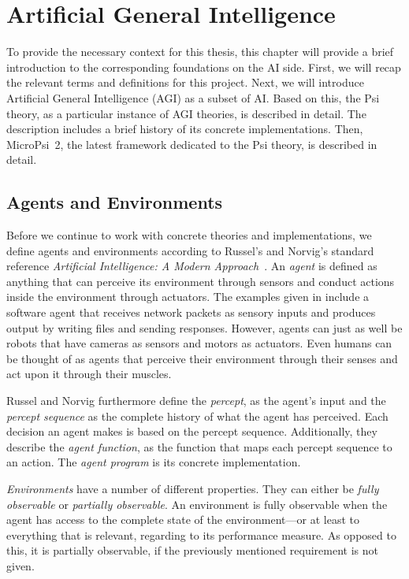 \chapter{Artificial General Intelligence}
\label{chap:2}
To provide the necessary context for this thesis, this chapter will provide a brief introduction to the corresponding foundations on the AI side. First, we will recap the relevant terms and definitions for this project. Next, we will introduce Artificial General Intelligence (AGI) as a subset of AI. Based on this, the Psi theory, as a particular instance of AGI theories, is described in detail. The description includes a brief history of its concrete implementations. Then, MicroPsi~2, the latest framework dedicated to the Psi theory, is described in detail.

    \section{Agents and Environments} 

Before we continue to work with concrete theories and implementations, we define agents and environments according to Russel's and Norvig's standard reference \emph{Artificial Intelligence: A Modern Approach}~\cite{russell2009artificial}. An \emph{agent} is defined as anything that can perceive its environment through sensors and conduct actions inside the environment through actuators. The examples given in \cite{russell2009artificial} include a software agent that receives network packets as sensory inputs and produces output by writing files and sending responses. However, agents can just as well be robots that have cameras as sensors and motors as actuators. Even humans can be thought of as agents that perceive their environment through their senses and act upon it through their muscles.

Russel and Norvig furthermore define the \emph{percept}, as the agent's input and the \emph{percept sequence} as the complete history of what the agent has perceived. Each decision an agent makes is based on the percept sequence. Additionally, they describe the \emph{agent function}, as the function that maps each percept sequence to an action. The \emph{agent program} is its concrete implementation.

\emph{Environments} have a number of different properties. They can either be \emph{fully observable} or \emph{partially observable}. An environment is fully observable when the agent has access to the complete state of the environment---or at least to everything that is relevant, regarding to its performance measure. As opposed to this, it is partially observable, if the previously mentioned requirement is not given.

